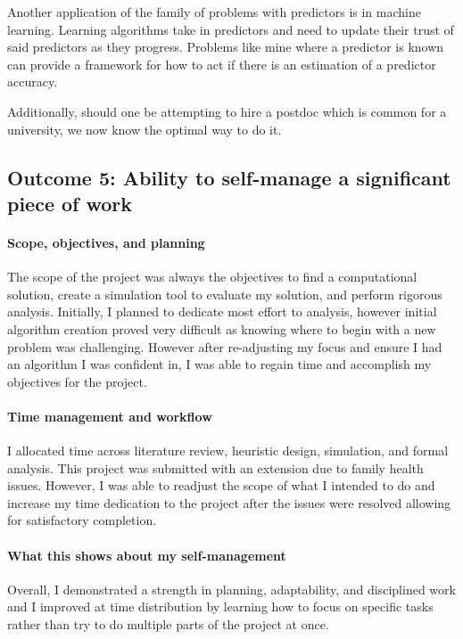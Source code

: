 \documentclass[a4paper,11pt]{article}
\begin{document}
Another application of the family of problems with predictors is in machine learning. Learning algorithms take in predictors and need to update their trust of said predictors as they progress. Problems like mine where a predictor is known can provide a framework for how to act if there is an estimation of a predictor accuracy.

Additionally, should one be attempting to hire a postdoc which is common for a university, we now know the optimal way to do it.

\subsection*{Outcome 5: Ability to self-manage a significant piece of work}

\paragraph{Scope, objectives, and planning}
The scope of the project was always the objectives to find a computational solution, create a simulation tool to evaluate my solution, and perform rigorous analysis. Initially, I planned to dedicate most effort to analysis, however initial algorithm creation proved very difficult as knowing where to begin with a new problem was challenging. However after re-adjusting my focus and ensure I had an algorithm I was confident in, I was able to regain time and accomplish my objectives for the project.

\paragraph{Time management and workflow}
I allocated time across literature review, heuristic design, simulation, and formal analysis. This project was submitted with an extension due to family health issues. However, I was able to readjust the scope of what I intended to do and increase my time dedication to the project after the issues were resolved allowing for satisfactory completion.

\paragraph{What this shows about my self-management}
Overall, I demonstrated a strength in planning, adaptability, and disciplined work and I improved at time distribution by learning how to focus on specific tasks rather than try to do multiple parts of the project at once.
\end{document}
